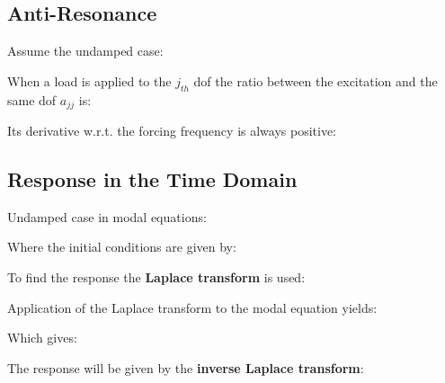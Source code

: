 \documentclass[10pt,a4paper]{scrartcl}
\begin{document}
\begin{multicols*}{2}
\subsection{Anti-Resonance}

Assume the undamped case:


When a load is applied to the $j_{th}$ dof the ratio between the excitation and the same dof $a_{jj}$ is:


Its derivative w.r.t. the forcing frequency is always positive:



\subsection{Response in the Time Domain}

Undamped case in modal equations:


Where the initial conditions are given by:


To find the response the \textbf{Laplace transform} is used:


Application of the Laplace transform to the modal equation yields:


Which gives:


The response will be given by the \textbf{inverse Laplace transform}:


\end{multicols*}
\end{document}
